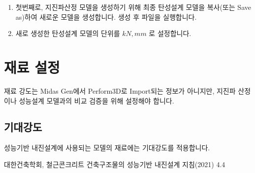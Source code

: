 \documentclass[a4paper,11pt,korean,openany,oneside]{sphinxmanual}
\begin{document}
\begin{sphinxShadowBox}
\begin{enumerate}
%
\item {} 
\sphinxAtStartPar
첫번째로, 지진파산정 모델을 생성하기 위해 최종 탄성설계 모델을 복사(또는 Save as)하여 새로운 모델을 생성합니다. 생성 후 파일을 실행합니다.

\item {} 
\sphinxAtStartPar
새로 생성한 탄성설계 모델의 단위를 \(kN, mm\) 로 설정합니다.

\end{enumerate}
\end{sphinxShadowBox}

\sphinxstepscope


\section{재료 설정}
\label{\detokenize{1_material_setting:id1}}\label{\detokenize{1_material_setting::doc}}
\sphinxAtStartPar
재료 강도는 Midas Gen에서 Perform\sphinxhyphen{}3D로 Import되는 정보가 아니지만,
지진파 산정이나 성능설계 모델과의 비교 검증을 위해 설정해야 합니다.


\subsection{기대강도}
\label{\detokenize{1_material_setting:id2}}
\sphinxAtStartPar
성능기반 내진설계에 사용되는 모델의 재료에는 기대강도를 적용합니다. %
\begin{footnote}[1]\sphinxAtStartFootnote
대한건축학회, 철근콘크리트 건축구조물의 성능기반 내진설계 지침(2021) 4.4
%
\end{footnote}

\begin{figure}[htbp]
\centering
\capstart

\noindent{}
\caption{}\label{\detokenize{1_material_setting:id12}}\end{figure}
\end{document}
